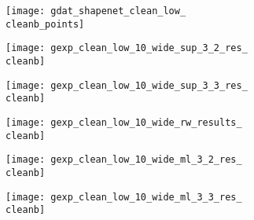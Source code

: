 \begin{figure*}[t]
{\begin{subfigure}[t]{1\textwidth}
\begin{subfigure}[t]{0.095\textwidth}
        	\vspace{0px}\centering
        	\texttt{[image: gdat\_shapenet\_clean\_low\_\\cleanb\_points]}
        \end{subfigure}
        \begin{subfigure}[t]{0.095\textwidth}
        	\vspace{0px}\centering
        	\texttt{[image: gexp\_clean\_low\_10\_wide\_sup\_3\_2\_res\_\\cleanb]}
        \end{subfigure}
        \begin{subfigure}[t]{0.095\textwidth}
        	\vspace{0px}\centering
        	\texttt{[image: gexp\_clean\_low\_10\_wide\_sup\_3\_3\_res\_\\cleanb]}
        \end{subfigure}
        \begin{subfigure}[t]{0.095\textwidth}
        	\vspace{0px}\centering
        	\texttt{[image: gexp\_clean\_low\_10\_wide\_rw\_results\_\\cleanb]}
        \end{subfigure}
        \begin{subfigure}[t]{0.095\textwidth}
            \vspace{0px}\centering
            \texttt{[image: gexp\_clean\_low\_10\_wide\_ml\_3\_2\_res\_\\cleanb]}
        \end{subfigure}
        \begin{subfigure}[t]{0.095\textwidth}
        	\vspace{0px}\centering
        	\texttt{[image: gexp\_clean\_low\_10\_wide\_ml\_3\_3\_res\_\\cleanb]}
        \end{subfigure}
        \begin{subfigure}[t]{0.095\textwidth}
        	\vspace{0px}\centering

\end{subfigure}
\end{subfigure}}
\end{figure*}
